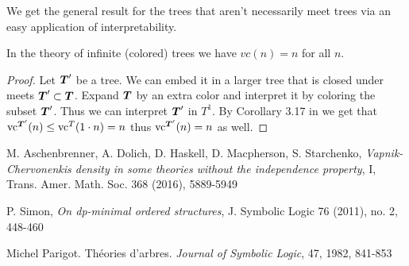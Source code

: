 \documentclass{amsart}
\DeclareMathOperator{\TT}{\boldface T}
\begin{document}
	We get the general result for the trees that aren't necessarily meet trees via an easy application of interpretability.
	\begin{Corollary}
		In the theory of infinite (colored) trees we have $vc(n) = n$ for all $n$.
	\end{Corollary}
	\begin{proof}
		Let $\TT'$ be a tree. We can embed it in a larger tree that is closed under meets $\TT' \subset \TT$. Expand $\TT$ by an extra color and interpret it by coloring the subset $\TT'$. Thus we can interpret $\TT'$ in $T^1$. By Corollary 3.17 in \cite{vc_density} we get that $\vc^{\TT'}(n) \leq \vc^T(1 \cdot n) = n$ thus $\vc^{\TT'}(n) = n$ as well.
	\end{proof}


	
	\begin{thebibliography}{9}

  M. Aschenbrenner, A. Dolich, D. Haskell, D. Macpherson, S. Starchenko,
  \textit{Vapnik-Chervonenkis density in some theories without the independence property}, I,
  Trans. Amer. Math. Soc. 368 (2016), 5889-5949

	P. Simon,
	\textit{On dp-minimal ordered structures},
	J. Symbolic Logic 76 (2011), no. 2, 448-460

	Michel Parigot.
	Th\'eories d'arbres.
	\textit{Journal of Symbolic Logic}, 47, 1982, 841-853
	
	
\end{thebibliography}
\end{document}
